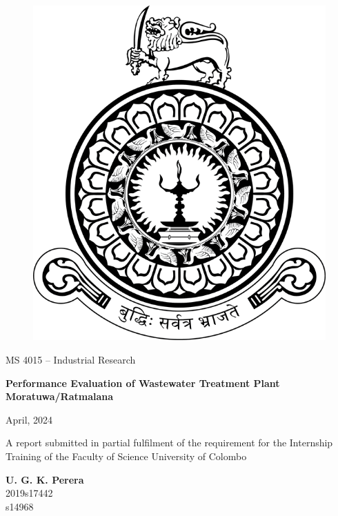 \begin{titlepage}
\begin{figure}[H]
\centering
\includegraphics[width=0.5\linewidth]{logo.png}
\end{figure}


   \begin{center}
       \vspace*{1cm}

       MS 4015 – Industrial Research

       \vspace{0.5cm}
        {\fontsize{20}{24}\selectfont \textbf{Performance Evaluation of Wastewater Treatment Plant Moratuwa/Ratmalana}}
            
       \vspace{1.5cm}

       April, 2024

       \vfill
            
      A report submitted in partial fulfilment of the requirement for the Internship \\
       Training of the Faculty of Science University of Colombo
            
       \vspace{0.8cm}
            
       \textbf{U. G. K. Perera}\\
       2019s17442\\
       s14968\\
       
            
   \end{center}
\end{titlepage}
